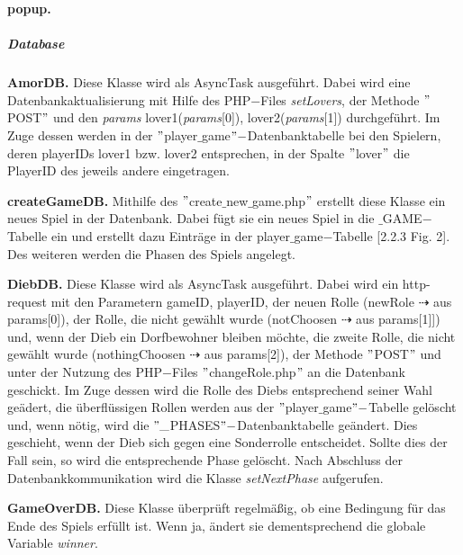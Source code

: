 \documentclass[12pt]{article}
\begin{document}
\textbf{popup.}



		\subparagraph{Database}
		
\textbf{AmorDB.}
Diese Klasse wird als AsyncTask ausgeführt. Dabei wird eine Datenbankaktualisierung mit Hilfe des PHP$-$Files \textit{setLovers}, der Methode $"$POST$"$ und den \textit{params} lover1(\textit{params}[0]), lover2(\textit{params}[1]) durchgeführt. Im Zuge dessen werden in der $"$player$\_$game$"-$Datenbanktabelle bei den Spielern, deren playerIDs lover1 bzw. lover2 entsprechen, in der Spalte $"$lover$"$ die PlayerID des jeweils andere eingetragen.

\vspace{0,3 cm}

\textbf{createGameDB.}
Mithilfe des $"$create$\_$new$\_$game.php$"$ erstellt diese Klasse ein neues Spiel in der Datenbank. Dabei fügt sie ein neues Spiel in die $\_$GAME$-$Tabelle ein und erstellt dazu Einträge in der player$\_$game$-$Tabelle [2.2.3 Fig. 2]. Des weiteren werden die Phasen des Spiels angelegt.

\vspace{0,3 cm}

\textbf{DiebDB.}
Diese Klasse wird als AsyncTask ausgeführt. Dabei wird ein http-request mit den Parametern gameID, playerID, der neuen Rolle 
(newRole $\dashrightarrow$ aus params[0]), der Rolle, die nicht gewählt wurde (notChoosen $\dashrightarrow$ aus params[1]]) und, wenn der Dieb ein Dorfbewohner bleiben möchte, die zweite Rolle, die nicht gewählt wurde (nothingChoosen $\dashrightarrow$ aus params[2]), der Methode $"$POST$"$ und unter der Nutzung des PHP$-$Files $"$changeRole.php$"$ an die Datenbank geschickt. Im Zuge dessen wird die Rolle des Diebs entsprechend seiner Wahl geädert, die überflüssigen Rollen werden aus der $"$player$\_$game$"-$Tabelle gelöscht und, wenn nötig, wird die $"\_$PHASES$"-$Datenbanktabelle geändert. Dies geschieht, wenn der Dieb sich gegen eine Sonderrolle entscheidet. Sollte dies der Fall sein, so wird die entsprechende Phase gelöscht. Nach Abschluss der Datenbankkommunikation wird die Klasse \textit{setNextPhase} aufgerufen.

\vspace{0,3 cm}

\textbf{GameOverDB.}
Diese Klasse überprüft regelmäßig, ob eine Bedingung für das Ende des Spiels erfüllt ist. Wenn ja, ändert sie dementsprechend die globale Variable \textit{winner}.

\vspace{0,3 cm}
\end{document}
